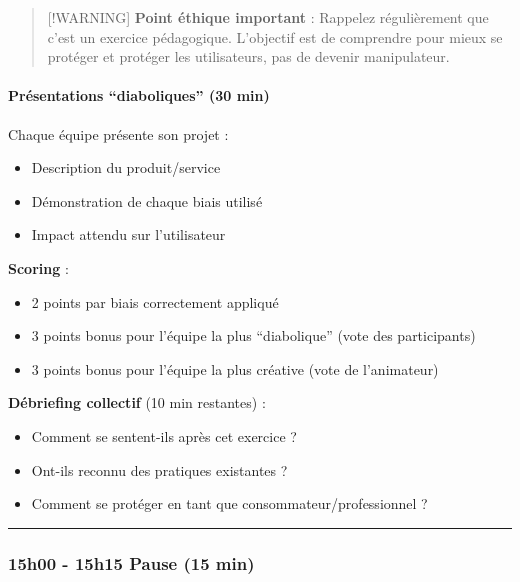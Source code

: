 \documentclass[
]{article}
\providecommand{\tightlist}{%
  \setlength{\itemsep}{0pt}\setlength{\parskip}{0pt}}
\begin{document}
\begin{quote}
{[}!WARNING{]} \textbf{Point éthique important} : Rappelez régulièrement
que c'est un exercice pédagogique. L'objectif est de comprendre pour
mieux se protéger et protéger les utilisateurs, pas de devenir
manipulateur.
\end{quote}

\paragraph{Présentations ``diaboliques'' (30
min)}\label{pruxe9sentations-diaboliques-30-min}

Chaque équipe présente son projet :

\begin{itemize}
\tightlist
\item
  Description du produit/service
\item
  Démonstration de chaque biais utilisé
\item
  Impact attendu sur l'utilisateur
\end{itemize}

\textbf{Scoring} :

\begin{itemize}
\tightlist
\item
  2 points par biais correctement appliqué
\item
  3 points bonus pour l'équipe la plus ``diabolique'' (vote des
  participants)
\item
  3 points bonus pour l'équipe la plus créative (vote de l'animateur)
\end{itemize}

\textbf{Débriefing collectif} (10 min restantes) :

\begin{itemize}
\tightlist
\item
  Comment se sentent-ils après cet exercice ?
\item
  Ont-ils reconnu des pratiques existantes ?
\item
  Comment se protéger en tant que consommateur/professionnel ?
\end{itemize}

\begin{center}\rule{0.5\linewidth}{0.5pt}\end{center}

\subsubsection{\texorpdfstring{\textbf{15h00 - 15h15 \textbar{} Pause
(15
min)}}{15h00 - 15h15 \textbar{} Pause (15 min)}}\label{h00---15h15-pause-15-min}
\end{document}
